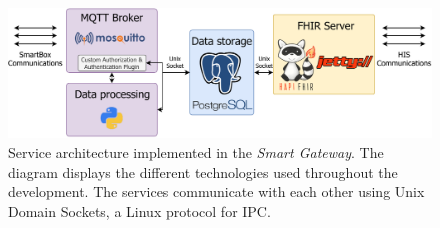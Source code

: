 \begin{figure}[H]
    \centering
    \includegraphics[width=0.93\linewidth]{images/service overview gateway.pdf}
    \caption[Service architecture implemented in the \textit{Smart Gateway}.]{Service architecture implemented in the \textit{Smart Gateway}. The diagram displays the different technologies used throughout the development. The services communicate with each other using Unix Domain Sockets, a Linux protocol for \acf{IPC}.}
    \label{fig:gateway_serviceoverview}
\end{figure}
